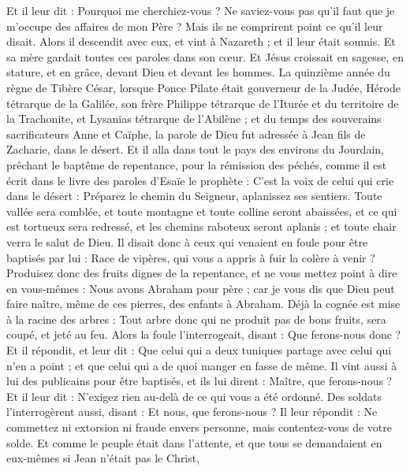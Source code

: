 \begin{multicols}{2}
Et il leur dit : Pourquoi me cherchiez-vous ? Ne saviez-vous pas qu'il faut que je m’occupe des affaires de mon Père ?
Mais ils ne comprirent point ce qu'il leur disait.
Alors il descendit avec eux, et vint à Nazareth ; et il leur était soumis. Et sa mère gardait toutes ces paroles dans son cœur.
Et Jésus croissait en sagesse, en stature, et en grâce, devant Dieu et devant les hommes.
\VerseOne{}La quinzième année du règne de Tibère César, lorsque Ponce Pilate était gouverneur de la Judée, Hérode tétrarque de la Galilée, son frère Philippe tétrarque de l’Iturée et du territoire de la Trachonite, et Lysanias tétrarque de l’Abilène ;
et du temps des souverains sacrificateurs Anne et Caïphe, la parole de Dieu fut adressée à Jean fils de Zacharie, dans le désert.
Et il alla dans tout le pays des environs du Jourdain, prêchant le baptême de repentance, pour la rémission des péchés,
comme il est écrit dans le livre des paroles d'Esaïe le prophète : C’est la voix de celui qui crie dans le désert : Préparez le chemin du Seigneur, aplanissez ses sentiers.
Toute vallée sera comblée, et toute montagne et toute colline seront abaissées, et ce qui est tortueux sera redressé, et les chemins raboteux seront aplanis ;
et toute chair verra le salut de Dieu.
Il disait donc à ceux qui venaient en foule pour être baptisés par lui : Race de vipères, qui vous a appris à fuir la colère à venir ?
Produisez donc des fruits dignes de la repentance, et ne vous mettez point à dire en vous-mêmes : Nous avons Abraham pour père ; car je vous dis que Dieu peut faire naître, même de ces pierres, des enfants à Abraham.
Déjà la cognée est mise à la racine des arbres : Tout arbre donc qui ne produit pas de bons fruits, sera coupé, et jeté au feu.
Alors la foule l'interrogeait, disant : Que ferons-nous donc ?
Et il répondit, et leur dit : Que celui qui a deux tuniques partage avec celui qui n'en a point ; et que celui qui a de quoi manger en fasse de même.
Il vint aussi à lui des publicains pour être baptisés, et ils lui dirent : Maître, que ferons-nous ?
Et il leur dit : N'exigez rien au-delà de ce qui vous a été ordonné.
Des soldats l'interrogèrent aussi, disant : Et nous, que ferons-nous ? Il leur répondit : Ne commettez ni extorsion ni fraude envers personne, mais contentez-vous de votre solde.
Et comme le peuple était dans l'attente, et que tous se demandaient en eux-mêmes si Jean n'était pas le Christ,

\end{multicols}
